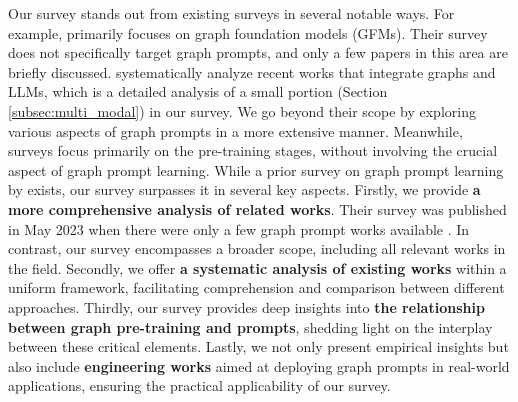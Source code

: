 Our survey stands out from existing surveys in several notable ways. For example, \citet{liu2023graph} primarily focuses on graph foundation models (GFMs). Their survey does not specifically target graph prompts, and only a few papers in this area are briefly discussed. \citet{li2023survey} systematically analyze recent works that integrate graphs and LLMs, which is a detailed analysis of a small portion (Section \ref{subsec:multi_modal}) in our survey. We go beyond their scope by exploring various aspects of graph prompts in a more extensive manner. Meanwhile, surveys \cite{xie2023selfsupervised, yu2023selfsupervised} focus primarily on the pre-training stages, without involving the crucial aspect of graph prompt learning. While a prior survey on graph prompt learning by \citet{wu2023survey} exists, our survey surpasses it in several key aspects. Firstly, we provide \textbf{a more comprehensive analysis of related works}. Their survey was published in May 2023 when there were only a few graph prompt works available \cite{sun2022gppt, zhu2023sglpt, fang2022prompt}. In contrast, our survey encompasses a broader scope, including all relevant works in the field. Secondly, we offer \textbf{a systematic analysis of existing works} within a uniform framework, facilitating comprehension and comparison between different approaches. Thirdly, our survey provides deep insights into \textbf{the relationship between graph pre-training and prompts}, shedding light on the interplay between these critical elements. Lastly, we not only present empirical insights but also include \textbf{engineering works} aimed at deploying graph prompts in real-world applications, ensuring the practical applicability of our survey.